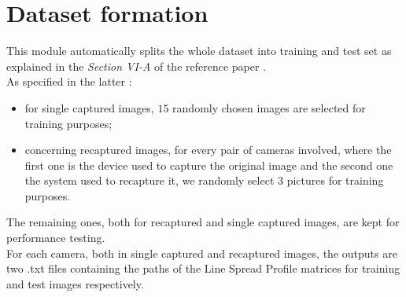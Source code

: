 \section{Dataset formation}
This module automatically splits the whole dataset into training and test set as explained in the \textit{Section VI-A} of the reference paper \cite{paper}.\\
As specified in the latter :
\begin{itemize}
    \item for single captured images, $15$ randomly chosen images are selected for training purposes;
    \item concerning recaptured images, for every pair of cameras involved, where the first one is the device used to capture the original image and the second one the system used to recapture it, we randomly select $3$ pictures for training purposes.
\end{itemize}
The remaining ones, both for recaptured and single captured images, are kept for performance testing.\\
For each camera, both in single captured and recaptured images, the outputs are two .txt files containing the paths of the Line Spread Profile matrices for training and test images respectively.